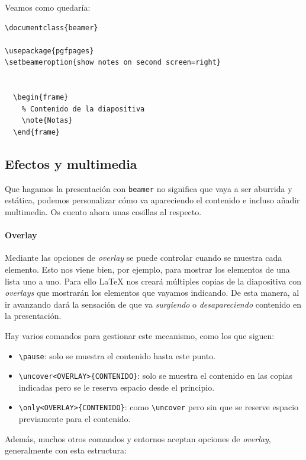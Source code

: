 Veamos como quedaría:

\begin{lstlisting}[language={[latex]tex}]
\documentclass{beamer}

\usepackage{pgfpages}
\setbeameroption{show notes on second screen=right}


  \begin{frame}
    % Contenido de la diapositiva
    \note{Notas}
  \end{frame}

\end{lstlisting}

\subsection{Efectos y multimedia}

Que hagamos la presentación con \lstinline!beamer! no significa que vaya
a ser aburrida y estática, podemos personalizar cómo va apareciendo el
contenido e incluso añadir multimedia. Os cuento ahora unas cosillas al
respecto.

\paragraph{Overlay}

Mediante las opciones de \emph{overlay} se puede controlar cuando se
muestra cada elemento. Esto nos viene bien, por ejemplo, para mostrar
los elementos de una lista uno a uno. Para ello LaTeX nos creará
múltiples copias de la diapositiva con \emph{overlays} que mostrarán los
elementos que vayamos indicando. De esta manera, al ir avanzando dará la
sensación de que va \emph{surgiendo} o \emph{desapareciendo} contenido
en la presentación.

Hay varios comandos para gestionar este mecanismo, como los que siguen:

\begin{itemize}
\item
  \lstinline!\pause!: solo se muestra el contenido hasta este punto.
\item
  \lstinline!\uncover<OVERLAY>{CONTENIDO}!: solo se muestra el contenido
  en las copias indicadas pero se le reserva espacio desde el principio.
\item
  \lstinline!\only<OVERLAY>{CONTENIDO}!: como \lstinline!\uncover! pero
  sin que se reserve espacio previamente para el contenido.
\end{itemize}

Además, muchos otros comandos y entornos aceptan opciones de
\emph{overlay}, generalmente con esta estructura:

